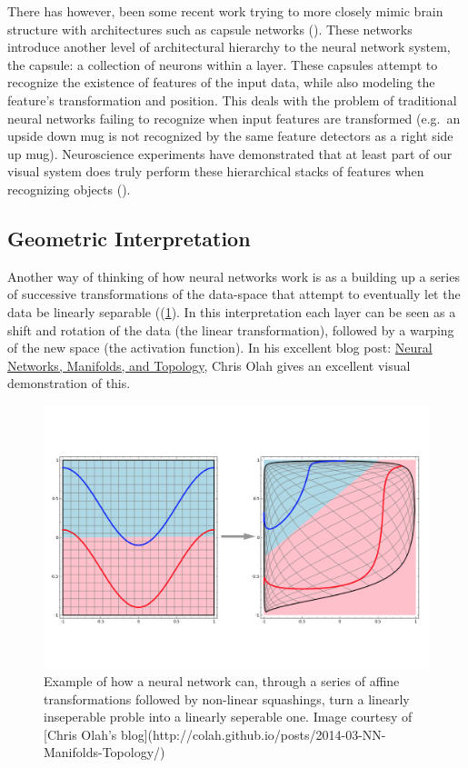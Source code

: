 \documentclass[]{book}
\theoremstyle{definition}
\theoremstyle{definition}
\theoremstyle{definition}
\theoremstyle{remark}
\begin{document}
There has however, been some recent work trying to more closely mimic
brain structure with architectures such as capsule networks
(\citet{capsnet}). These networks introduce another level of
architectural hierarchy to the neural network system, the capsule: a
collection of neurons within a layer. These capsules attempt to
recognize the existence of features of the input data, while also
modeling the feature's transformation and position. This deals with the
problem of traditional neural networks failing to recognize when input
features are transformed (e.g.~an upside down mug is not recognized by
the same feature detectors as a right side up mug). Neuroscience
experiments have demonstrated that at least part of our visual system
does truly perform these hierarchical stacks of features when
recognizing objects (\citet{cnn_animals}).

\subsection{Geometric Interpretation}\label{geometric-interpretation}

Another way of thinking of how neural networks work is as a building up
a series of successive transformations of the data-space that attempt to
eventually let the data be linearly separable
((\ref{fig:geometricinterp}). In this interpretation each layer can be
seen as a shift and rotation of the data (the linear transformation),
followed by a warping of the new space (the activation function). In his
excellent blog post:
\href{http://colah.github.io/posts/2014-03-NN-Manifolds-Topology/}{Neural
Networks, Manifolds, and Topology}, Chris Olah gives an excellent visual
demonstration of this.

\begin{figure}

{\centering \includegraphics{figures/warp_space} 

}

\caption{Example of how a neural network can, through a series of affine transformations followed by non-linear squashings, turn a linearly inseperable proble into a linearly seperable one. Image courtesy of [Chris Olah's blog](http://colah.github.io/posts/2014-03-NN-Manifolds-Topology/)}\label{fig:geometricinterp}
\end{figure}
\end{document}
